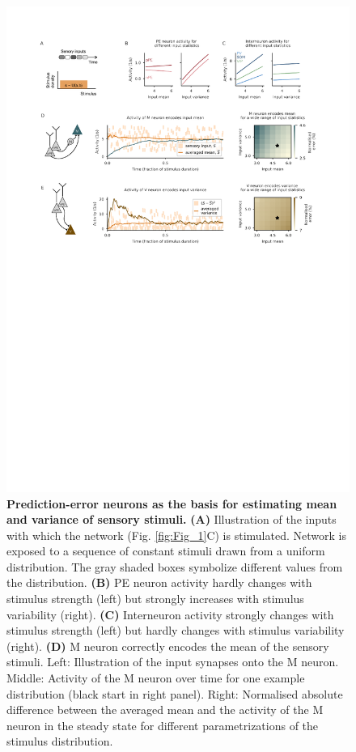 \documentclass[10pt,a4paper]{article}
\begin{document}
\begin{figure}[t!]
	\centering
    \includegraphics[width=1\linewidth]{../results/figures/final/Fig_2}
\caption{\footnotesize{\bf Prediction-error neurons as the basis for estimating mean and variance of sensory stimuli.\newline} 
{\bf (A)} Illustration of the inputs with which the network (Fig. \ref{fig:Fig_1}C) is stimulated. Network is exposed to a sequence of constant stimuli drawn from a uniform distribution. The gray shaded boxes symbolize different values from the distribution.
{\bf (B)} PE neuron activity hardly changes with stimulus strength (left) but strongly increases with stimulus variability (right).
{\bf (C)} Interneuron activity strongly changes with stimulus strength (left) but hardly changes with stimulus variability (right).
{\bf (D)} M neuron correctly encodes the mean of the sensory stimuli. Left: Illustration of the input synapses onto the M neuron. Middle: Activity of the M neuron over time for one example distribution (black start in right panel). Right: Normalised absolute difference between the averaged mean and the activity of the M neuron in the steady state for different parametrizations of the stimulus distribution.
}
\end{figure}
\end{document}
